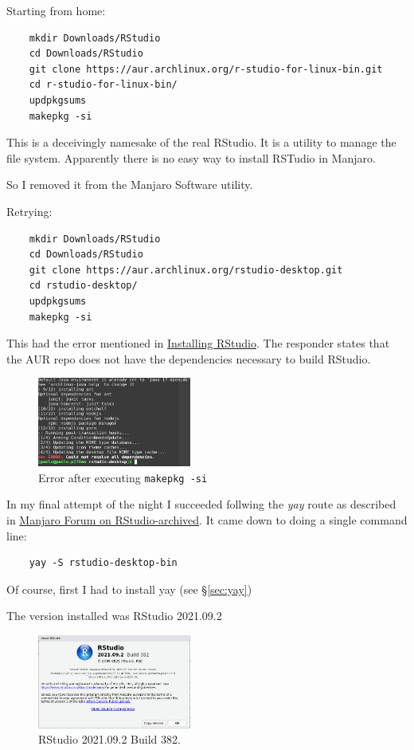 \documentclass[]{scrartcl}
\begin{document}
Starting from home:

\begin{verbatim}
	mkdir Downloads/RStudio
	cd Downloads/RStudio
	git clone https://aur.archlinux.org/r-studio-for-linux-bin.git
	cd r-studio-for-linux-bin/
	updpkgsums
	makepkg -si	
\end{verbatim}

This is a deceivingly namesake of the real RStudio. It is a utility to manage the file system.
Apparently there is no easy way to install RSTudio in Manjaro.

So I removed it from the Manjaro Software utility.

Retrying:

\begin{verbatim}
	mkdir Downloads/RStudio
	cd Downloads/RStudio
	git clone https://aur.archlinux.org/rstudio-desktop.git
	cd rstudio-desktop/
	updpkgsums
	makepkg -si	
\end{verbatim}

This had the error mentioned in \href{https://forum.manjaro.org/t/rstudio-on-pinebook-pro-aarch64/60827/6?u=padames}{Installing RStudio}. The responder states that the AUR repo does not have the dependencies necessary to build RStudio.

\begin{figure}[!htb]
	\centering
	\caption{Error after executing \texttt{makepkg -si}}
	\includegraphics[width=0.45\textwidth]{Images/ErrorInstallingAUR.png}
\end{figure}

In my final attempt of the night I succeeded follwing the \textit{yay} route as described in \href{https://archived.forum.manjaro.org/t/using-the-statistical-package-r-in-manjaro-with-rstudio/484}{Manjaro Forum on RStudio-archived}. 
It came down to doing a single command line:
\begin{verbatim}
	yay -S rstudio-desktop-bin
\end{verbatim}
Of course, first I had to install yay (see \S\ref{sec:yay})

The version installed was RStudio 2021.09.2

\begin{figure}[!htb]
	\centering
	\caption{RStudio 2021.09.2 Build 382.}
	\includegraphics[width=0.45\textwidth]{Images/RStudioSplashWindowFeb07-2022.png}
\end{figure}
\end{document}
